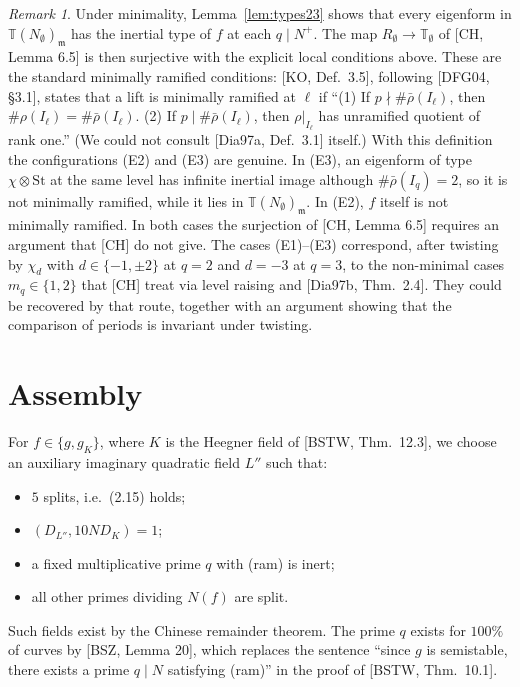 \documentclass[11pt]{amsart}
\theoremstyle{definition}
\theoremstyle{remark}
\newtheorem{remark}[theorem]{Remark}
\newcommand{\St}{\mathrm{St}}
\begin{document}
\begin{remark}
Under minimality, Lemma~\ref{lem:types23} shows that every eigenform in $\mathbb T(N_\emptyset)_{\mathfrak m}$ has the inertial type of $f$ at each $q\mid N^+$. The map $R_\emptyset\to\mathbb T_\emptyset$ of [CH, Lemma 6.5] is then surjective with the explicit local conditions above. These are the standard minimally ramified conditions: [KO, Def.~3.5], following [DFG04, \S3.1], states that a lift is minimally ramified at $\ell$ if ``(1) If $p\nmid\#\bar\rho(I_\ell)$, then $\#\rho(I_\ell)=\#\bar\rho(I_\ell)$. (2) If $p\mid\#\bar\rho(I_\ell)$, then $\rho|_{I_\ell}$ has unramified quotient of rank one.'' (We could not consult [Dia97a, Def.~3.1] itself.) With this definition the configurations (E2) and (E3) are genuine. In (E3), an eigenform of type $\chi\otimes\St$ at the same level has infinite inertial image although $\#\bar\rho(I_q)=2$, so it is not minimally ramified, while it lies in $\mathbb T(N_\emptyset)_{\mathfrak m}$. In (E2), $f$ itself is not minimally ramified. In both cases the surjection of [CH, Lemma 6.5] requires an argument that [CH] do not give. The cases (E1)--(E3) correspond, after twisting by $\chi_d$ with $d\in\{-1,\pm2\}$ at $q=2$ and $d=-3$ at $q=3$, to the non-minimal cases $m_q\in\{1,2\}$ that [CH] treat via level raising and [Dia97b, Thm.~2.4]. They could be recovered by that route, together with an argument showing that the comparison of periods is invariant under twisting.
\end{remark}

\section{Assembly}\label{sec:assembly}
For $f\in\{g,g_K\}$, where $K$ is the Heegner field of [BSTW, Thm.~12.3], we choose an auxiliary imaginary quadratic field $L''$ such that:
\begin{itemize}
\item $5$ splits, i.e.\ (2.15) holds;
\item $(D_{L''},10ND_K)=1$;
\item a fixed multiplicative prime $q$ with (ram) is inert;
\item all other primes dividing $N(f)$ are split.
\end{itemize}
Such fields exist by the Chinese remainder theorem. The prime $q$ exists for $100\%$ of curves by [BSZ, Lemma 20], which replaces the sentence ``since $g$ is semistable, there exists a prime $q\mid N$ satisfying (ram)'' in the proof of [BSTW, Thm.~10.1].
\end{document}
